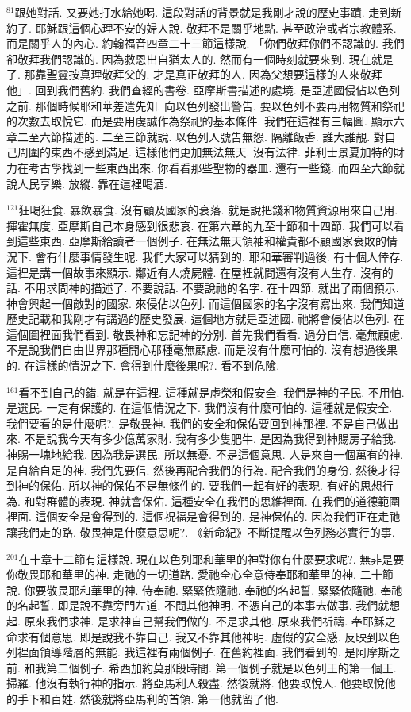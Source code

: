 \documentclass{book}
\begin{document}
$^{81}$跟她對話.
又要她打水給她喝.
這段對話的背景就是我剛才說的歷史事蹟.
走到新約了.
耶穌跟這個心理不安的婦人說.
敬拜不是關乎地點.
甚至政治或者宗教體系.
而是關乎人的內心.
約翰福音四章二十三節這樣說.
「你們敬拜你們不認識的.
我們卻敬拜我們認識的.
因為救恩出自猶太人的.
然而有一個時刻就要來到.
現在就是了.
那靠聖靈按真理敬拜父的.
才是真正敬拜的人.
因為父想要這樣的人來敬拜他」.
回到我們舊約.
我們查經的書卷.
亞摩斯書描述的處境.
是亞述國侵佔以色列之前.
那個時候耶和華差遣先知.
向以色列發出警告.
要以色列不要再用物質和祭祀的次數去取悅它.
而是要用虔誠作為祭祀的基本條件.
我們在這裡有三幅圖.
顯示六章二至六節描述的.
二至三節就說.
以色列人號告無怨.
隔離飯香.
誰大誰靚.
對自己周圍的東西不感到滿足.
這樣他們更加無法無天.
沒有法律.
菲利士景夏加特的財力在考古學找到一些東西出來.
你看看那些聖物的器皿.
還有一些錢.
而四至六節就說人民享樂.
放縱.
靠在這裡喝酒.

$^{121}$狂喝狂食.
暴飲暴食.
沒有顧及國家的衰落.
就是說把錢和物質資源用來自己用.
揮霍無度.
亞摩斯自己本身感到很悲哀.
在第六章的九至十節和十四節.
我們可以看到這些東西.
亞摩斯給讀者一個例子.
在無法無天領袖和權貴都不顧國家衰敗的情況下.
會有什麼事情發生呢.
我們大家可以猜到的.
耶和華審判過後.
有十個人倖存.
這裡是講一個故事來顯示.
鄰近有人燒屍體.
在屋裡就問還有沒有人生存.
沒有的話.
不用求問神的描述了.
不要說話.
不要說祂的名字.
在十四節.
就出了兩個預示.
神會興起一個敵對的國家.
來侵佔以色列.
而這個國家的名字沒有寫出來.
我們知道歷史記載和我剛才有講過的歷史發展.
這個地方就是亞述國.
祂將會侵佔以色列.
在這個圖裡面我們看到.
敬畏神和忘記神的分別.
首先我們看看.
過分自信.
毫無顧慮.
不是說我們自由世界那種開心那種毫無顧慮.
而是沒有什麼可怕的.
沒有想過後果的.
在這樣的情況之下.
會得到什麼後果呢?.
看不到危險.

$^{161}$看不到自己的錯.
就是在這裡.
這種就是虛榮和假安全.
我們是神的子民.
不用怕.
是選民.
一定有保護的.
在這個情況之下.
我們沒有什麼可怕的.
這種就是假安全.
我們要看的是什麼呢?.
是敬畏神.
我們的安全和保佑要回到神那裡.
不是自己做出來.
不是說我今天有多少億萬家財.
我有多少隻肥牛.
是因為我得到神賜房子給我.
神賜一塊地給我.
因為我是選民.
所以無憂.
不是這個意思.
人是來自一個萬有的神.
是自給自足的神.
我們先要信.
然後再配合我們的行為.
配合我們的身份.
然後才得到神的保佑.
所以神的保佑不是無條件的.
要我們一起有好的表現.
有好的思想行為.
和對群體的表現.
神就會保佑.
這種安全在我們的思維裡面.
在我們的道德範圍裡面.
這個安全是會得到的.
這個祝福是會得到的.
是神保佑的.
因為我們正在走祂讓我們走的路.
敬畏神是什麼意思呢?.
《新命紀》不斷提醒以色列務必實行的事.

$^{201}$在十章十二節有這樣說.
現在以色列耶和華里的神對你有什麼要求呢?.
無非是要你敬畏耶和華里的神.
走祂的一切道路.
愛祂全心全意侍奉耶和華里的神.
二十節說.
你要敬畏耶和華里的神.
侍奉祂.
緊緊依隨祂.
奉祂的名起誓.
緊緊依隨祂.
奉祂的名起誓.
即是說不靠旁門左道.
不問其他神明.
不憑自己的本事去做事.
我們就想起.
原來我們求神.
是求神自己幫我們做的.
不是求其他.
原來我們祈禱.
奉耶穌之命求有個意思.
即是說我不靠自己.
我又不靠其他神明.
虛假的安全感.
反映到以色列裡面領導階層的無能.
我這裡有兩個例子.
在舊約裡面.
我們看到的.
是阿摩斯之前.
和我第二個例子.
希西加約莫那段時間.
第一個例子就是以色列王的第一個王.
掃羅.
他沒有執行神的指示.
將亞馬利人殺盡.
然後就將.
他要取悅人.
他要取悅他的手下和百姓.
然後就將亞馬利的首領.
第一他就留了他.
\end{document}
